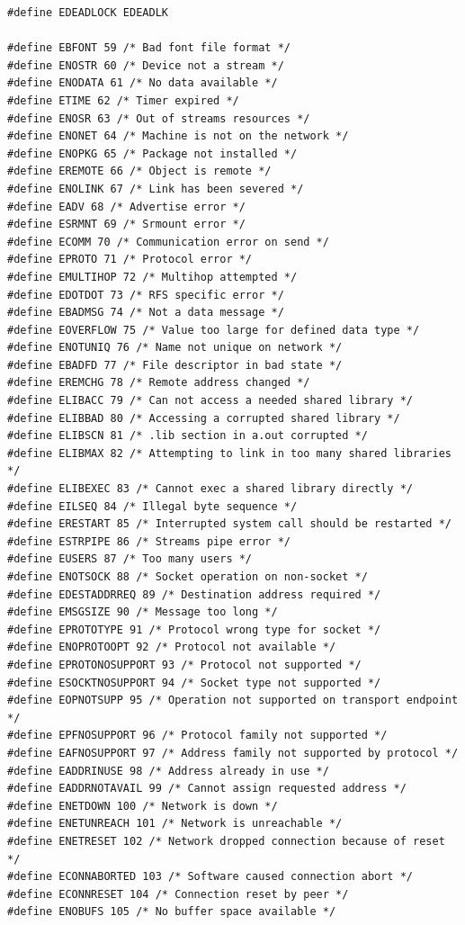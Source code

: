 \documentclass[french]{scrartcl}
\begin{document}
\begin{lstlisting}[multicols=2]
#define EDEADLOCK EDEADLK  

#define EBFONT 59 /* Bad font file format */ 
#define ENOSTR 60 /* Device not a stream */ 
#define ENODATA 61 /* No data available */ 
#define ETIME 62 /* Timer expired */ 
#define ENOSR 63 /* Out of streams resources */ 
#define ENONET 64 /* Machine is not on the network */ 
#define ENOPKG 65 /* Package not installed */ 
#define EREMOTE 66 /* Object is remote */ 
#define ENOLINK 67 /* Link has been severed */ 
#define EADV 68 /* Advertise error */ 
#define ESRMNT 69 /* Srmount error */ 
#define ECOMM 70 /* Communication error on send */ 
#define EPROTO 71 /* Protocol error */ 
#define EMULTIHOP 72 /* Multihop attempted */ 
#define EDOTDOT 73 /* RFS specific error */ 
#define EBADMSG 74 /* Not a data message */ 
#define EOVERFLOW 75 /* Value too large for defined data type */ 
#define ENOTUNIQ 76 /* Name not unique on network */ 
#define EBADFD 77 /* File descriptor in bad state */ 
#define EREMCHG 78 /* Remote address changed */ 
#define ELIBACC 79 /* Can not access a needed shared library */ 
#define ELIBBAD 80 /* Accessing a corrupted shared library */ 
#define ELIBSCN 81 /* .lib section in a.out corrupted */ 
#define ELIBMAX 82 /* Attempting to link in too many shared libraries */ 
#define ELIBEXEC 83 /* Cannot exec a shared library directly */ 
#define EILSEQ 84 /* Illegal byte sequence */ 
#define ERESTART 85 /* Interrupted system call should be restarted */ 
#define ESTRPIPE 86 /* Streams pipe error */ 
#define EUSERS 87 /* Too many users */ 
#define ENOTSOCK 88 /* Socket operation on non-socket */ 
#define EDESTADDRREQ 89 /* Destination address required */ 
#define EMSGSIZE 90 /* Message too long */ 
#define EPROTOTYPE 91 /* Protocol wrong type for socket */ 
#define ENOPROTOOPT 92 /* Protocol not available */ 
#define EPROTONOSUPPORT 93 /* Protocol not supported */ 
#define ESOCKTNOSUPPORT 94 /* Socket type not supported */ 
#define EOPNOTSUPP 95 /* Operation not supported on transport endpoint */ 
#define EPFNOSUPPORT 96 /* Protocol family not supported */ 
#define EAFNOSUPPORT 97 /* Address family not supported by protocol */ 
#define EADDRINUSE 98 /* Address already in use */ 
#define EADDRNOTAVAIL 99 /* Cannot assign requested address */ 
#define ENETDOWN 100 /* Network is down */ 
#define ENETUNREACH 101 /* Network is unreachable */ 
#define ENETRESET 102 /* Network dropped connection because of reset */ 
#define ECONNABORTED 103 /* Software caused connection abort */ 
#define ECONNRESET 104 /* Connection reset by peer */ 
#define ENOBUFS 105 /* No buffer space available */ 

\end{lstlisting}
\end{document}
